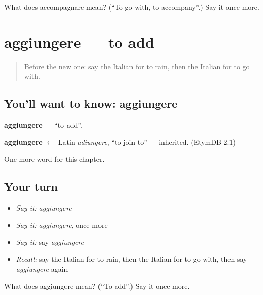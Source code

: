\begin{tcolorbox}[breakable,colback=teal!4,colframe=teal!35!black,title={Before you move on}]
What does accompagnare mean? (\textquotedblleft{}To go with, to accompany\textquotedblright{}.) Say it once more.
\end{tcolorbox}
\section[aggiungere]{aggiungere — to add}

\label{lesson:IT-C178-aggiungere}



\begin{quote}
Before the new one: say the Italian for to rain, then the Italian for to go with.
\end{quote}

\subsection*{You'll want to know: aggiungere}
\textbf{aggiungere} — \textquotedblleft{}to add\textquotedblright{}.

\begin{cousinweb}
\textbf{aggiungere} $\leftarrow$ Latin \emph{adiungere}, \textquotedblleft{}to join to\textquotedblright{} — inherited. (EtymDB 2.1)
\end{cousinweb}

\begin{grammarlens}[title={What you've built}]
One more word for this chapter.
\end{grammarlens}

\subsection*{Your turn}
\begin{itemize}
\raggedright
  \item \emph{Say it:} \emph{aggiungere}
  \item \emph{Say it:} \emph{aggiungere}, once more
  \item \emph{Say it:} say \emph{aggiungere}
  \item \emph{Recall:} say the Italian for to rain, then the Italian for to go with, then say \emph{aggiungere} again
\end{itemize}

\begin{tcolorbox}[breakable,colback=teal!4,colframe=teal!35!black,title={Before you move on}]
What does aggiungere mean? (\textquotedblleft{}To add\textquotedblright{}.) Say it once more.
\end{tcolorbox}
